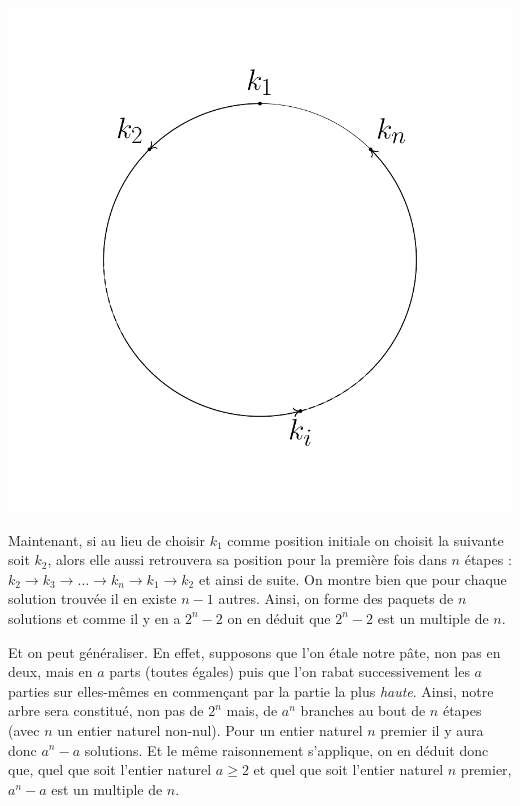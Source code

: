 \documentclass[a4paper,french,12pt]{article}
\begin{document}
\begin{center}
\includegraphics[scale=0.45]{../TeXGraph/Pdf/position_periodique_2.pdf}
\end{center}

Maintenant, si au lieu de choisir $k_1$ comme position initiale on choisit la suivante soit $k_2$, alors elle aussi retrouvera sa position pour la première fois dans $n$ étapes : $k_2\rightarrow k_3\rightarrow\ldots\rightarrow k_n\rightarrow k_1\rightarrow k_2$ et ainsi de suite. On montre bien que pour chaque solution trouvée il en existe $n-1$ autres. Ainsi, on forme des paquets de $n$ solutions et comme il y en a $2^n - 2$ on en déduit que $2^n - 2$ est un multiple de $n$.


Et on peut généraliser. En effet, supposons que l'on étale notre pâte, non pas en deux, mais en $a$ parts (toutes égales) puis que l'on rabat successivement les $a$ parties sur elles-mêmes en commençant par la partie la plus \emph{haute}. Ainsi, notre arbre sera constitué, non pas de $2^n$ mais, de $a^n$ branches au bout de $n$ étapes (avec $n$ un entier naturel non-nul). Pour un entier naturel $n$ premier il y aura donc $a^n - a$ solutions. Et le même raisonnement s'applique, on en déduit donc que, quel que soit l'entier naturel $a\geqslant 2$ et quel que soit l'entier naturel $n$ premier, $a^n - a$ est un multiple de $n$. 
\end{document}
